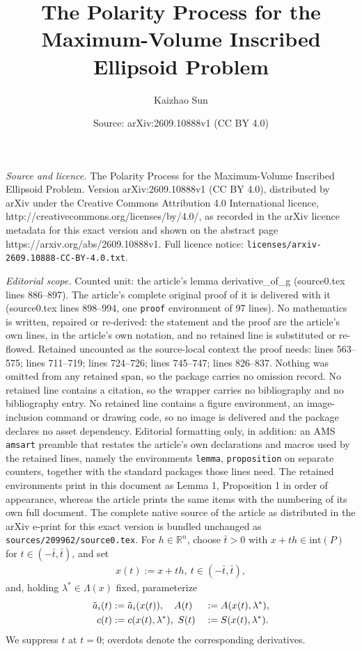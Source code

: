 \documentclass[10pt,a4paper]{amsart}
\title{The Polarity Process for the Maximum-Volume Inscribed Ellipsoid Problem}
\author{Kaizhao Sun}
\date{Source: arXiv:2609.10888v1 (CC BY 4.0)}
\newcommand{\R}{\mathbb{R}}
\begin{document}
\maketitle

\noindent\emph{Source and licence.} The Polarity Process for the Maximum-Volume Inscribed Ellipsoid Problem. Version arXiv:2609.10888v1 (CC BY 4.0), distributed by arXiv under the Creative Commons Attribution 4.0 International licence, http://creativecommons.org/licenses/by/4.0/, as recorded in the arXiv licence metadata for this exact version and shown on the abstract page https://arxiv.org/abs/2609.10888v1. Full licence notice: \texttt{licenses/arxiv-2609.10888-CC-BY-4.0.txt}.\par\smallskip

\noindent\textit{Editorial scope.} Counted unit: the article's lemma derivative\_of\_g (source0.tex lines 886--897). The article's complete original proof of it is delivered with it (source0.tex lines 898--994, one \texttt{proof} environment of 97 lines). No mathematics is written, repaired or re-derived: the statement and the proof are the article's own lines, in the article's own notation, and no retained line is substituted or re-flowed.  Retained uncounted as the source-local context the proof needs: lines 563--575; lines 711--719; lines 724--726; lines 745--747; lines 826--837.  Nothing was omitted from any retained span, so the package carries no omission record.  No retained line contains a citation, so the wrapper carries no bibliography and no bibliography entry.  No retained line contains a figure environment, an image-inclusion command or drawing code, so no image is delivered and the package declares no asset dependency.  Editorial formatting only, in addition: an AMS \texttt{amsart} preamble that restates the article's own declarations and macros used by the retained lines, namely the environments \texttt{lemma}, \texttt{proposition} on separate counters, together with the standard packages those lines need.  The retained environments print in this document as Lemma 1, Proposition 1 in order of appearance, whereas the article prints the same items with the numbering of its own full document.  The complete native source of the article as distributed in the arXiv e-print for this exact version is bundled unchanged as \texttt{sources/209962/source0.tex}.
For $h\in\R^n$, choose $\bar t>0$ with
$x+th\in\mathrm{int}(P)$ for $t\in(-\bar t,\bar t)$, and set
\begin{align}\label{eq: x_along_h}
    x(t) := x + th,~ t\in(-\bar t,\bar t),
\end{align}
and, holding $\lambda^*\in\Lambda(x)$ fixed, parameterize
\begin{alignat}{2}\label{eq: parameterization_in_t}
     \tilde{a}_i(t) & :=  \tilde{a}_i(x(t)),\quad 
    A(t) && :=  A(x(t), \lambda^*), \notag \\ 
     c(t) &:=  c(x(t), \lambda^*),~
    S(t) && :=  S(x(t), \lambda^*).
\end{alignat}
We suppress $t$ at $t=0$; overdots denote the corresponding derivatives.
\end{document}
